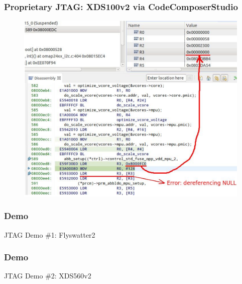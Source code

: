 \begin{frame}
  \frametitle{Proprietary JTAG: XDS100v2 via CodeComposerStudio}
  \begin{figure}
    \centering
    \includegraphics[scale=0.32]{images/uboot-jtag.png}
  \end{figure}
  \vspace*{-10mm}
\end{frame}


\begin{frame}[standout]
  \frametitle{Demo}
  JTAG Demo \#1: Flyswatter2
\end{frame}

\begin{frame}[standout]
  \frametitle{Demo}
  JTAG Demo \#2: XDS560v2
\end{frame}

